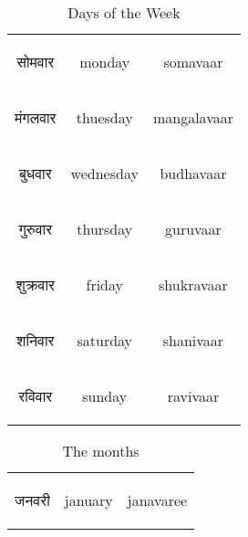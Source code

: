 \begin{table}[H]
    \centering
    \begin{tabular}{c|c|c}
\begin{hindi} सोमवार \end{hindi} & monday & somavaar \\  
\begin{hindi} मंगलवार \end{hindi} & thuesday & mangalavaar \\  
\begin{hindi} बुधवार \end{hindi} & wednesday & budhavaar \\ 
\begin{hindi} गुरुवार \end{hindi} & thursday & guruvaar \\ 
\begin{hindi} शुक्रवार \end{hindi} & friday & shukravaar \\ 
\begin{hindi} शनिवार \end{hindi} & saturday & shanivaar \\ 
\begin{hindi} रविवार \end{hindi} & sunday & ravivaar \\ 
    \end{tabular}
    \caption{Days of the Week}
    \label{tab:nouns_weekdays}
\end{table}

\begin{table}[H]
    \centering
    \begin{tabular}{c|c|c}
\begin{hindi} जनवरी \end{hindi} & january & janavaree \\  
    \end{tabular}
    \caption{The months}
    \label{tab:nouns_months}
\end{table}

